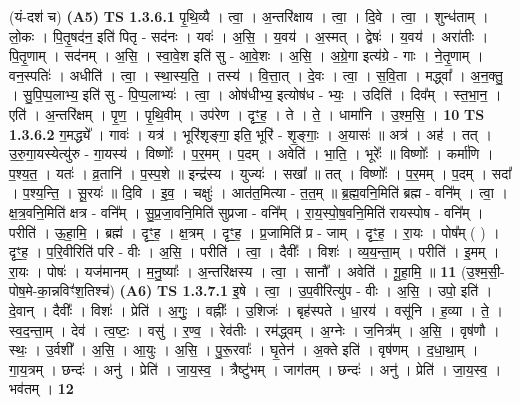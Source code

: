 \documentclass[17pt]{extarticle}
\begin{document}
                  \newline
                      (यं-दश॑ च)  \textbf{(A5)} \newline \newline
                                \textbf{ TS 1.3.6.1} \newline
                  पृ॒थि॒व्यै । त्वा॒ । अ॒न्तरि॑क्षाय । त्वा॒ । दि॒वे । त्वा॒ । शुन्ध॑ताम् । लो॒कः । पि॒तृ॒षद॑न॒ इति॑ पितृ - सद॑नः । यवः॑ । अ॒सि॒ । य॒वय॑ । अ॒स्मत् । द्वेषः॑ । य॒वय॑ । अरा॑तीः । पि॒तृ॒णाम् । सद॑नम् । अ॒सि॒ । स्वा॒वे॒श इति॑ सु - आ॒वे॒शः । अ॒सि॒ । अ॒ग्रे॒गा इत्य॑ग्रे - गाः । ने॒तृ॒णाम् । वन॒स्पतिः॑ । अधीति॑ । त्वा॒ । स्था॒स्य॒ति॒ । तस्य॑ । वि॒त्ता॒त् । दे॒वः । त्वा॒ । स॒वि॒ता । मद्ध्वा᳚ । अ॒न॒क्तु॒ । सु॒पि॒प्प॒लाभ्य॒ इति॑ सु - पि॒प्प॒लाभ्यः॑ । त्वा॒ । ओष॑धीभ्य॒ इत्योष॑ध - भ्यः॒ । उदिति॑ । दिव᳚म् । स्त॒भा॒न॒ । एति॑ । अ॒न्तरि॑क्षम् । पृ॒ण॒ । पृ॒थि॒वीम् । उप॑रेण । दृꣳ॒॒ह॒ । ते । ते॒ । धामा॑नि । उ॒श्म॒सि॒ । \textbf{  10} \newline
                  \newline
                                \textbf{ TS 1.3.6.2} \newline
                  ग॒मद्ध्ये᳚ । गावः॑ । यत्र॑ । भूरि॑शृङ्गा॒ इति॒ भूरि॑ - शृ॒ङ्गाः॒ । अ॒यासः॑ ॥ अत्र॑ । अह॑ । तत् । उ॒रु॒गा॒यस्येत्यु॑रु - गा॒यस्य॑ । विष्णोः᳚ । प॒र॒मम् । प॒दम् । अवेति॑ । भा॒ति॒ । भूरेः᳚ ॥ विष्णोः᳚ । कर्मा॑णि । प॒श्य॒त॒ । यतः॑ । व्र॒तानि॑ । प॒स्प॒शे ॥ इन्द्र॑स्य । युज्यः॑ । सखा᳚ ॥ तत् । विष्णोः᳚ । प॒र॒मम् । प॒दम् । सदा᳚ । प॒श्य॒न्ति॒ । सू॒रयः॑ ॥ दि॒वि । इ॒व॒ । चक्षुः॑ । आत॑त॒मित्या - त॒त॒म् ॥ ब्र॒ह्म॒वनि॒मिति॑ ब्रह्म - वनि᳚म् । त्वा॒ । क्ष॒त्र॒वनि॒मिति॑ क्षत्र - वनि᳚म् । सु॒प्र॒जा॒वनि॒मिति॑ सुप्रजा - वनि᳚म् । रा॒य॒स्पो॒ष॒वनि॒मिति॑ रायस्पोष - वनि᳚म् । परीति॑ । ऊ॒हा॒मि॒ । ब्रह्म॑ । दृꣳ॒॒ह॒ । क्ष॒त्रम् । दृꣳ॒॒ह॒ । प्र॒जामिति॑ प्र - जाम् । दृꣳ॒॒ह॒ । रा॒यः । पोष᳚म् ( ) । दृꣳ॒॒ह॒ । प॒रि॒वीरिति॑ परि - वीः । अ॒सि॒ । परीति॑ । त्वा॒ । दैवीः᳚ । विशः॑ । व्य॒य॒न्ता॒म् । परीति॑ । इ॒मम् । रा॒यः । पोषः॑ । यज॑मानम् । म॒नु॒ष्याः᳚ । अ॒न्तरि॑क्षस्य । त्वा॒ । सानौ᳚ । अवेति॑ । गू॒हा॒मि॒ ॥ \textbf{  11 } \newline
                  \newline
                      (उ॒श्म॒सी॒-पोष॒मे-का॒न्नविꣳ॑श॒तिश्च॑)  \textbf{(A6)} \newline \newline
                                \textbf{ TS 1.3.7.1} \newline
                  इ॒षे । त्वा॒ । उ॒प॒वीरित्यु॑प - वीः । अ॒सि॒ । उपो॒ इति॑ । दे॒वान् । दैवीः᳚ । विशः॑ । प्रेति॑ । अ॒गुः॒ । वह्नीः᳚ । उ॒शिजः॑ । बृह॑स्पते । धा॒रय॑ । वसू॑नि । ह॒व्या । ते॒ । स्व॒द॒न्ता॒म् । देव॑ । त्व॒ष्टः॒ । वसु॑ । र॒ण्व॒ । रेव॑तीः । रम॑द्ध्वम् । अ॒ग्नेः । ज॒नित्र᳚म् । अ॒सि॒ । वृष॑णौ । स्थः॒ । उ॒र्वशी᳚ । अ॒सि॒ । आ॒युः । अ॒सि॒ । पु॒रू॒रवाः᳚ । घृ॒तेन॑ । अ॒क्ते इति॑ । वृष॑णम् । द॒धा॒था॒म् । गा॒य॒त्रम् । छन्दः॑ । अनु॑ । प्रेति॑ । जा॒य॒स्व॒ । त्रैष्टु॑भम् । जाग॑तम् । छन्दः॑ । अनु॑ । प्रेति॑ । जा॒य॒स्व॒ । भव॑तम् । \textbf{  12} \newline
\end{document}
